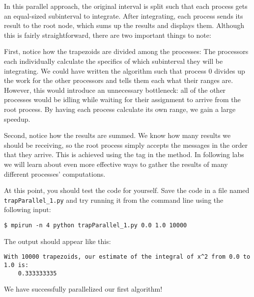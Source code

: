 

In this parallel approach, the original interval is split such that each process gets an equal-sized subinterval to integrate. After integrating, each process sends its result to the root node, which sums up the results and displays them. Although this is fairly straightforward, there are two important things to note:

First, notice how the trapezoids are divided among the processes: The processors each individually calculate the specifics of which subinterval they will be integrating. We could have written the algorithm such that process 0 divides up the work for the other processors and tells them each what their ranges are. However, this would introduce an unnecessary bottleneck: all of the other processes would be idling while waiting for their assignment to arrive from the root process. By having each process calculate its own range, we gain a large speedup.

Second, notice how the results are summed. We know how many results we should be receiving, so the root process simply accepts the messages in the order that they arrive. This is achieved using the tag  in the  method. In following labs we will learn about even more effective ways to gather the results of many different processes' computations.


At this point, you should test the code for yourself. Save the code in a file named \texttt{trapParallel\_1.py} and try running it from the command line using the following input: 
\begin{lstlisting}[style=ShellInput]
$ mpirun -n 4 python trapParallel_1.py 0.0 1.0 10000
\end{lstlisting}
The output should appear like this:
\begin{lstlisting}[style=ShellOutput]
With 10000 trapezoids, our estimate of the integral of x^2 from 0.0 to 1.0 is:
    0.333333335
\end{lstlisting}
We have successfully parallelized our first algorithm!



